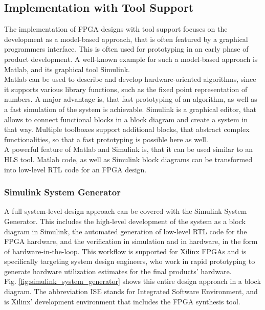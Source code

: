 \subsection{Implementation with Tool Support}

The implementation of FPGA designs with tool support focuses on the development as a model-based approach, that is often featured by a graphical programmers interface.
This is often used for prototyping in an early phase of product development.
A well-known example for such a model-based approach is Matlab, and its graphical tool Simulink.\\

Matlab can be used to describe and develop hardware-oriented algorithms, since it supports various library functions, such as the fixed point representation of numbers.
A major advantage is, that fast prototyping of an algorithm, as well as a fast simulation of the system is achievable.
Simulink is a graphical editor, that allows to connect functional blocks in a block diagram and create a system in that way.
Multiple toolboxes support additional blocks, that abstract complex functionalities, so that a fast prototyping is possible here as well.\\

A powerful feature of Matlab and Simulink is, that it can be used similar to an HLS tool.
Matlab code, as well as Simulink block diagrams can be transformed into low-level RTL code for an FPGA design.

\subsubsection{Simulink System Generator}

A full system-level design approach can be covered with the Simulink System Generator.
This includes the high-level development of the system as a block diagram in Simulink, the automated generation of low-level RTL code for the FPGA hardware, and the verification in simulation and in hardware, in the form of hardware-in-the-loop.
This workflow is supported for Xilinx FPGAs and is specifically targeting system design engineers, who work in rapid prototyping to generate hardware utilization estimates for the final products' hardware.\\

Fig. \ref{fig:simulink_system_generator} shows this entire design approach in a block diagram.
The abbreviation ISE stands for Integrated Software Environment, and is Xilinx' development environment that includes the FPGA synthesis tool.

